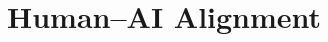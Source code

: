 \documentclass{article}
\theoremstyle{plain}
\theoremstyle{definition}
\theoremstyle{remark}
\begin{document}






\section{Human--AI Alignment}
\end{document}
